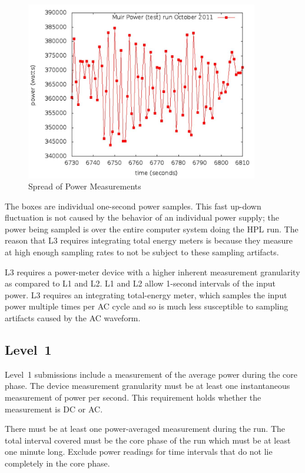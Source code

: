 \begin{figure}
\centering
\includegraphics[width=4in]{fig3-2}
\caption{Spread of Power Measurements}
\label{fig:sopm}
\end{figure}

\noindent
The boxes are individual one-second power samples.
This fast up-down fluctuation is not caused by the behavior of an individual power supply; the power being sampled is over the entire computer system doing the HPL run.
The reason that L3 requires integrating total energy meters is because they measure at high enough sampling rates to not be subject to these sampling artifacts.
\wl

\noindent
L3 requires a power-meter device with a higher inherent measurement granularity as compared to L1 and L2.
L1 and L2 allow 1-second intervals of the input power.
L3 requires an integrating total-energy meter, which samples the input power multiple times per AC cycle and so is much less susceptible to sampling artifacts caused by the AC waveform.

\subsection{Level~1}
\noindent
Level~1 submissions include a measurement of the average power during the core phase.
The device measurement granularity must be at least one instantaneous measurement of power per second.
This requirement holds whether the measurement is DC or AC.
\wl

\noindent
There must be at least one power-averaged measurement during the run.
The total interval covered must be the core phase of the run which must be at least one minute long.
Exclude power readings for time intervals that do not lie completely in the core phase.
\wl

